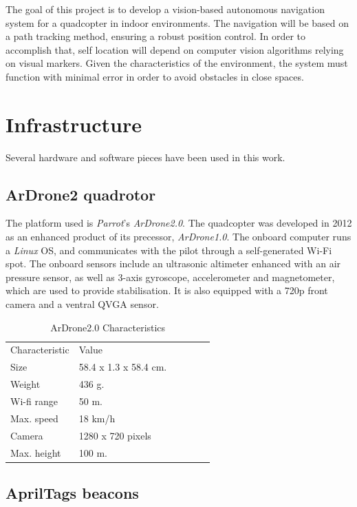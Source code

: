 \documentclass{styles/svproc}
\begin{document}
	The goal of this project is to develop a vision-based autonomous navigation system for a quadcopter in indoor environments. The navigation will be based on a path tracking method, ensuring a robust position control. In order to accomplish that, self location will depend on computer vision algorithms relying on visual markers. Given the characteristics of the environment, the system must function with minimal error in order to avoid obstacles in close spaces.

\section{Infrastructure}

Several hardware and software pieces have been used in this work.

\subsection{ArDrone2 quadrotor}

	The platform used is \textit{Parrot}'s \textit{ArDrone2.0}. The quadcopter was developed in 2012 as an enhanced product of its precessor, \textit{ArDrone1.0}. The onboard computer runs a \textit{Linux} OS, and communicates with the pilot through a self-generated Wi-Fi spot. The onboard sensors include an ultrasonic altimeter enhanced with an air pressure sensor, as well as 3-axis gyroscope, accelerometer and magnetometer, which are used to provide stabilisation. It is also equipped with a 720p front camera and a ventral QVGA sensor.
	
	\begin{table}
	\centering
	\setlength\tabcolsep{7pt}
	\caption{ArDrone2.0 Characteristics}
	\begin{tabular}{llllll}
	\hline\noalign{\smallskip}
	Characteristic  & Value\\
	\noalign{\smallskip}
	\hline
	\noalign{\smallskip}
		Size & 58.4 x 1.3 x 58.4 cm. \\
		Weight & 436 g. \\
		Wi-fi range & 50 m. \\
		Max. speed & 18 km/h \\
		Camera  & 1280 x 720 pixels \\
		Max. height & 100 m.\\
	\hline
	\end{tabular}
	\end{table}

\subsection{AprilTags beacons}
\end{document}
